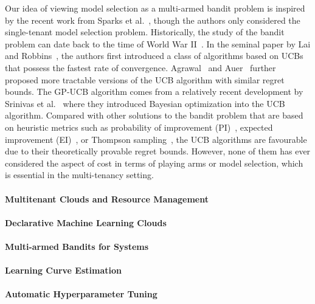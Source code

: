 \documentclass[letterpaper]{vldb}
\begin{document}
Our idea of viewing model selection as a multi-armed bandit problem is inspired by the recent work from Sparks et al.~\cite{SparksTHFJK15}, though the authors only considered the single-tenant model selection problem.
Historically, the study of the bandit problem can date back to the time of World War II~\cite{Robbins:1952}.
In the seminal paper by Lai and Robbins~\cite{Lai:1985}, the authors first introduced a class of algorithms based on UCBs that possess the fastest rate of convergence.
Agrawal~\cite{Agrawal1995} and Auer~\cite{Auer02,Auer:2002} further proposed more tractable versions of the UCB algorithm with similar regret bounds.
The GP-UCB algorithm comes from a relatively recent development by Srinivas et al.~\cite{SrinivasKKS10} where they introduced Bayesian optimization into the UCB algorithm.
Compared with other solutions to the bandit problem that are based on heuristic metrics such as probability of improvement (PI)~\cite{Kushner1964}, expected improvement (EI)~\cite{SnoekLA12}, or Thompson sampling~\cite{ChapelleL11,KaufmannKM12,Scott:2010},
the UCB algorithms are favourable due to their theoretically provable regret bounds.
However, none of them has ever considered the aspect of cost in terms of playing arms or model selection, which is essential in the multi-tenancy setting.

\paragraph*{Multitenant Clouds and Resource Management}

\paragraph*{Declarative Machine Learning Clouds}

\paragraph*{Multi-armed Bandits for Systems}

\paragraph*{Learning Curve Estimation}

\paragraph*{Automatic Hyperparameter Tuning}
\end{document}
